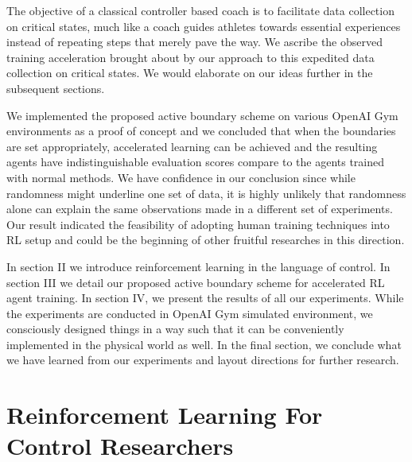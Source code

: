 \documentclass[journal]{IEEEtran}
\begin{document}
The objective of a classical controller based coach is to facilitate data collection on critical states, much like a coach guides athletes towards essential experiences instead of repeating steps that merely pave the way. We ascribe the observed training acceleration brought about by our approach to this expedited data collection on critical states. We would elaborate on our ideas further in the subsequent sections.

We implemented the proposed active boundary scheme on various OpenAI Gym environments as a proof of concept and we concluded that when the boundaries are set appropriately, accelerated learning can be achieved and the resulting agents have indistinguishable evaluation scores compare to the agents trained with normal methods. We have confidence in our conclusion since while randomness might underline one set of data, it is highly unlikely that randomness alone can explain the same observations made in a different set of experiments. Our result indicated the feasibility of adopting human training techniques into RL setup and could be the beginning of other fruitful researches in this direction.

In section II we introduce reinforcement learning in the language of control. In section III we detail our proposed active boundary scheme for accelerated RL agent training. In section IV, we present the results of all our experiments. While the experiments are conducted in OpenAI Gym simulated environment, we consciously designed things in a way such that it can be conveniently implemented in the physical world as well. In the final section, we conclude what we have learned from our experiments and layout directions for further research.

\section{Reinforcement Learning For Control Researchers}
\end{document}
